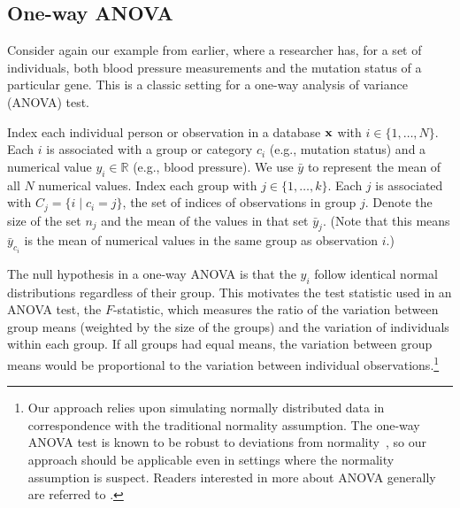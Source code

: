 
\subsection{One-way ANOVA}

Consider again our example from earlier, where a researcher has, for a set of individuals, both blood pressure measurements and the mutation status of a particular gene.  This is a classic setting for a one-way analysis of variance (ANOVA) test.

Index each individual person or observation in a database $\mathbf{x}$ with $i \in \{1, \ldots, N\}$. Each $i$ is associated with a group or category $c_i$ (e.g., mutation status) and a numerical value $y_i \in \mathbb{R}$ (e.g., blood pressure).  We use $\bar{y}$ to represent the mean of all $N$ numerical values. Index each group with $j \in \{1, \ldots, k\}$. Each $j$ is associated with $C_j = \{i \mid c_i=j\}$, the set of indices of observations in group $j$. Denote the size of the set $n_j$ and the mean of the values in that set $\bar{y}_j$.  (Note that this means $\bar{y}_{c_i}$ is the mean of numerical values in the same group as observation $i$.)

The null hypothesis in a one-way ANOVA is that the $y_i$ follow identical normal distributions regardless of their group. This motivates the test statistic used in an ANOVA test, the $F$-statistic, which measures the ratio of the variation between group means (weighted by the size of the groups) and the variation of individuals within each group. If all groups had equal means, the variation between group means would be proportional to the variation between individual observations.\footnote{Our approach relies upon simulating normally distributed data in correspondence with the traditional normality assumption. The one-way ANOVA test is known to be robust to deviations from normality~\cite{schmider2010}, so our approach should be applicable even in settings where the normality assumption is suspect. Readers interested in more about ANOVA generally are referred to \cite{cox1974theoretical}.}

